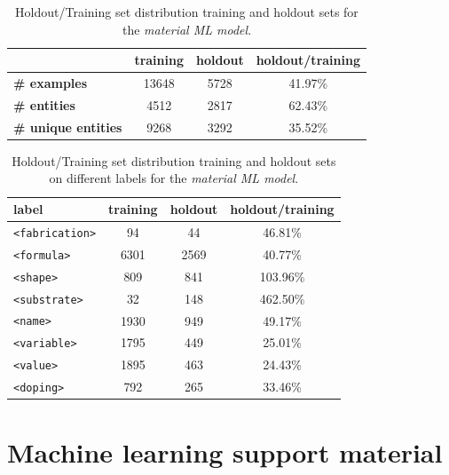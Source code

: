 \documentclass[]{interact}
\theoremstyle{plain}%
\theoremstyle{definition}
\theoremstyle{remark}
\begin{document}
\begin{table}[ht]
\centering\small
\begin{tabular}{lccc}
\toprule
& \textbf{training}  & \textbf{holdout} & \textbf{holdout/training}      \\
\midrule
\textbf{\# examples}        & 13648 & 5728  & 41.97\%   \\
\textbf{\# entities}        & 4512  & 2817  & 62.43\%   \\
\textbf{\# unique entities} & 9268  & 3292  & 35.52\%   \\
\bottomrule

\end{tabular}

\caption{Holdout/Training set distribution training and holdout sets for the \textit{material ML model}.}
\label{tab:training-holdout-set-material-distribution-annex}
\end{table}

\begin{table}[ht]
\centering\small
\begin{tabular}{lccc}
\toprule
label & \textbf{training}  & \textbf{holdout} & \textbf{holdout/training }     \\
\midrule
\texttt{<fabrication>}  & 94    & 44    & 46.81\%   \\
\texttt{<formula>}      & 6301  & 2569  & 40.77\%   \\
\texttt{<shape>}        & 809   & 841   & 103.96\%   \\
\texttt{<substrate>}    & 32    & 148   & 462.50\%   \\
\texttt{<name>}         & 1930  & 949   & 49.17\%   \\
\texttt{<variable>}     & 1795  & 449   & 25.01\%   \\
\texttt{<value>}        & 1895  & 463   & 24.43\%   \\
\texttt{<doping>}       & 792   & 265   & 33.46\%   \\
\bottomrule

\end{tabular}

\caption{Holdout/Training set distribution training and holdout sets on different labels for the \textit{material ML model}.}
\label{tab:training-holdout-labels-material-distribution-annex}
\end{table}


\section{Machine learning support material}
\end{document}
